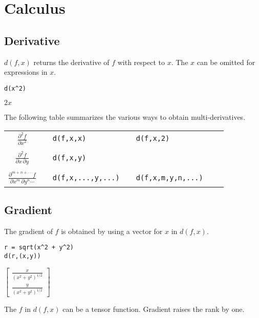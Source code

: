 \section{Calculus}

\subsection{Derivative}

$d(f,x)$ returns the derivative of $f$ with respect to $x$.
The $x$ can be omitted for expressions in $x$.

{\color{blue}
\begin{verbatim}
d(x^2)
\end{verbatim}
}

\noindent
$2x$

\bigskip
\noindent
The following table summarizes the various ways to obtain multi-derivatives.

\begin{center}
\begin{tabular}{cllllll}
$\displaystyle{\frac{\partial^2f}{\partial x^2}}$ & & \verb$d(f,x,x)$ & & \verb$d(f,x,2)$ \\
\\
$\displaystyle{\frac{\partial^2f}{\partial x\,\partial y}}$ & & \verb$d(f,x,y)$ \\
\\
$\displaystyle{\frac{\partial^{m+n+\cdot\cdot\cdot} f}{\partial x^m\,\partial y^n\cdots}}$ & &
\verb$d(f,x,...,y,...)$ & & \verb$d(f,x,m,y,n,...)$ \\
\end{tabular}
\end{center}

\subsection{Gradient}

The gradient of $f$ is obtained by using a vector for $x$ in $d(f,x)$.

{\color{blue}
\begin{verbatim}
r = sqrt(x^2 + y^2)
d(r,(x,y))
\end{verbatim}
}

\noindent
$\begin{bmatrix}\frac{x}{(x^2+y^2)^{1/2}}\\ \frac{y}{(x^2+y^2)^{1/2}}\end{bmatrix}$

\bigskip
\noindent
The $f$ in $d(f,x)$ can be a tensor function.
Gradient raises the rank by one.

